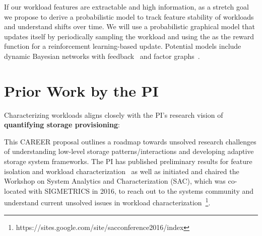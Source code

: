 If our workload features are extractable and high information, as a stretch
goal we propose to derive a probabilistic model to track feature stability of workloads and understand shifts over time. We will use a
probabilistic graphical model that updates itself by periodically sampling the
workload and using the  as the reward function for a
reinforcement learning-based update.  Potential models include dynamic Bayesian
networks with feedback~\cite{poupart2006analytic} and factor
graphs~\cite{lecunfactor}.  



\section{Prior Work by the PI}
Characterizing workloads aligns closely with the PI's research vision of \textbf{quantifying storage provisioning}:

This CAREER proposal outlines a roadmap towards unsolved research challenges of understanding low-level storage patterns/interactions and developing adaptive storage system frameworks.  The PI has published preliminary results for feature isolation and workload characterization~\cite{wildani2015case,TK_MASCOTSSNAP,TK_HOTSTORSNAP} as well as initiated and chaired the Workshop on System Analytics and Characterization (SAC), which was co-located with SIGMETRICS in 2016, to reach out to the systems community and understand current unsolved issues in workload characterization~\footnote{https://sites.google.com/site/sacconference2016/index}.     

